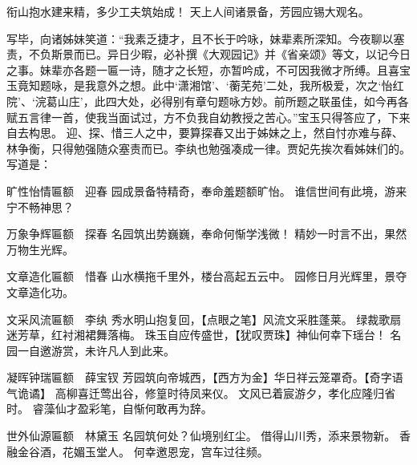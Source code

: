 \documentclass[12pt,oneside]{book}
\begin{document}
衔山抱水建来精，多少工夫筑始成！
天上人间诸景备，芳园应锡大观名。

写毕，向诸姊妹笑道：“我素乏捷才，且不长于吟咏，妹辈素所深知。今夜聊以塞责，不负斯景而已。异日少暇，必补撰《大观园记》并《省亲颂》等文，以记今日之事。妹辈亦各题一匾一诗，随才之长短，亦暂吟成，不可因我微才所缚。且喜宝玉竟知题咏，是我意外之想。此中‘潇湘馆’、‘蘅芜苑’二处，我所极爱，次之‘怡红院’、‘浣葛山庄’，此四大处，必得别有章句题咏方妙。前所题之联虽佳，如今再各赋五言律一首，使我当面试过，方不负我自幼教授之苦心。”宝玉只得答应了，下来自去构思。
迎、探、惜三人之中，要算探春又出于姊妹之上，然自忖亦难与薛、林争衡，只得勉强随众塞责而已。李纨也勉强凑成一律。贾妃先挨次看姊妹们的。写道是：

旷性怡情匾额　迎春
园成景备特精奇，奉命羞题额旷怡。
谁信世间有此境，游来宁不畅神思？

万象争辉匾额　探春
名园筑出势巍巍，奉命何惭学浅微！
精妙一时言不出，果然万物生光辉。

文章造化匾额　惜春
山水横拖千里外，楼台高起五云中。
园修日月光辉里，景夺文章造化功。

文采风流匾额　李纨
秀水明山抱复回，【点眼之笔】风流文采胜蓬莱。
绿裁歌扇迷芳草，红衬湘裙舞落梅。
珠玉自应传盛世，【犹叹贾珠】神仙何幸下瑶台！
名园一自邀游赏，未许凡人到此来。

凝晖钟瑞匾额　薛宝钗
芳园筑向帝城西，【西方为金】华日祥云笼罩奇。【奇字语气诡谲】
高柳喜迁莺出谷，修篁时待凤来仪。
文风已着宸游夕，孝化应隆归省时。
睿藻仙才盈彩笔，自惭何敢再为辞。

世外仙源匾额　林黛玉
名园筑何处？仙境别红尘。
借得山川秀，添来景物新。
香融金谷酒，花媚玉堂人。
何幸邀恩宠，宫车过往频。
\end{document}
